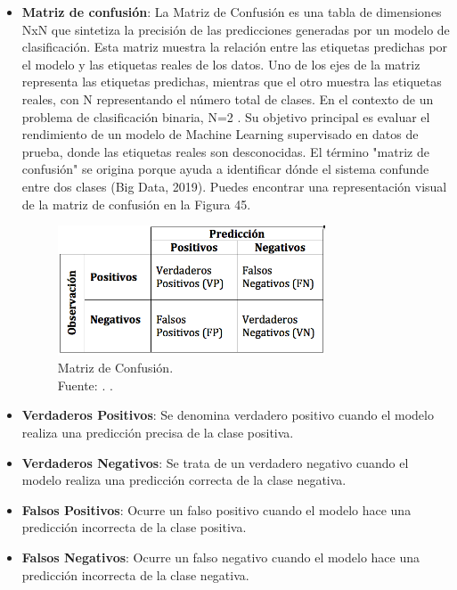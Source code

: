 \begin{itemize}
\item \textbf{Matriz de confusión}: La Matriz de Confusión es una tabla de dimensiones NxN que sintetiza la precisión de las predicciones generadas por un modelo de clasificación. Esta matriz muestra la relación entre las etiquetas predichas por el modelo y las etiquetas reales de los datos. Uno de los ejes de la matriz representa las etiquetas predichas, mientras que el otro muestra las etiquetas reales, con N representando el número total de clases. En el contexto de un problema de clasificación binaria, N=2 \parencite{gl_kohavi1998ml_glossary}. Su objetivo principal es evaluar el rendimiento de un modelo de Machine Learning supervisado en datos de prueba, donde las etiquetas reales son desconocidas. El término "matriz de confusión" se origina porque ayuda a identificar dónde el sistema confunde entre dos clases (Big Data, 2019). Puedes encontrar una representación visual de la matriz de confusión en la Figura 45.
\begin{figure}[H]
	\centering
	\includegraphics[width=0.75\textwidth]{3/figures/matriz_confusion.png}
	\caption[Matriz de Confusión]{Matriz de Confusión.\\ Fuente: \cite{gl_izco2018bdc}. .}
	\label{3:9}
\end{figure}
\end{itemize}

\begin{itemize}
    \item \textbf{Verdaderos Positivos}: Se denomina verdadero positivo cuando el modelo realiza una predicción precisa de la clase positiva.
    \item \textbf{Verdaderos Negativos}: Se trata de un verdadero negativo cuando el modelo realiza una predicción correcta de la clase negativa.
    \item \textbf{Falsos Positivos}: Ocurre un falso positivo cuando el modelo hace una predicción incorrecta de la clase positiva. 
    \item \textbf{Falsos Negativos}: Ocurre un falso negativo cuando el modelo hace una predicción incorrecta de la clase negativa. 
    \end{itemize}

